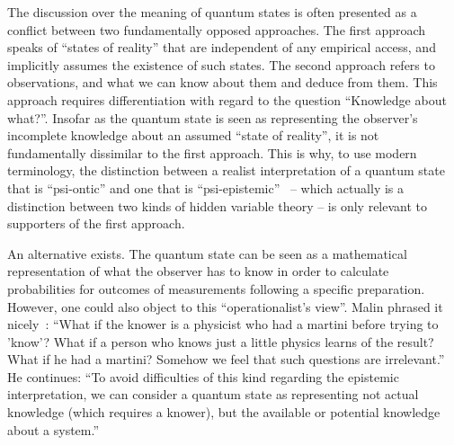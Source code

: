 \documentclass[12pt,a4]{article}
\begin{document}
The discussion over the meaning of quantum states is often presented as a conflict between two fundamentally opposed approaches. The first approach speaks of ``states of reality'' that are independent of any empirical access, and implicitly assumes the existence of such states. The second approach refers to observations, and what we can know about them and deduce from them. This approach requires differentiation with regard to the question ``Knowledge about what?''. Insofar as the quantum state is seen as representing the observer's incomplete knowledge about an assumed ``state of reality'', it is not fundamentally dissimilar to the first approach. This is why, to use modern terminology, the distinction between a realist interpretation of a quantum state that is ``psi-ontic'' and one that is ``psi-epistemic''~\cite{spekkens} -- which actually is a distinction between two kinds of hidden variable theory -- is only relevant to supporters of the first approach. 

An alternative exists. The quantum state can be seen as a mathematical representation of what the observer has to know in order to calculate probabilities for outcomes of measurements following a specific preparation. However, one could also object to this ``operationalist's view''. Malin phrased it nicely~\cite{malin}: ``What if the knower is a physicist who had a martini before trying to 'know'? What if a person who knows just a little physics learns of the result? What if he had a martini? Somehow we feel that such questions are irrelevant.'' He continues: ``To avoid difficulties of this kind regarding the epistemic interpretation, we can consider a quantum state as representing not actual knowledge (which requires a knower), but the available or potential knowledge about a system.''  
\end{document}
